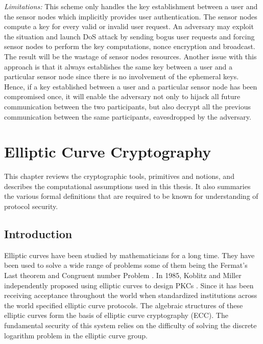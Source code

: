 \documentclass[a4paper,12pt]{report}
\begin{document}
\noindent \textit{Limitations:} This scheme only handles the key
establishment between a user and the sensor nodes which implicitly
provides user authentication. The sensor nodes compute a key for
every valid or invalid user request. An adversary may exploit the
situation and launch DoS attack by sending bogus user requests and
forcing sensor nodes to perform the key computations, nonce
encryption and broadcast. The result will be the wastage of sensor
nodes resources. Another issue with this approach is that it always
establishes the same key between a user and a particular sensor node
since there is no involvement of the ephemeral keys. Hence, if a key
established between a user and a particular sensor node has been
compromised once, it will enable the adversary not only to hijack
all future communication between the two participants, but also
decrypt all the previous communication between the same
participants, eavesdropped by the adversary.\\

\afterpage{\null\newpage}

\chapter{Elliptic Curve Cryptography}
\label{Ch3} This chapter reviews the cryptographic tools, primitives
and notions, and describes the computational assumptions used in
this thesis. It also summaries the various formal definitions that
are required to be known for understanding of protocol security.
\medskip
\medskip
\section{Introduction}
Elliptic curves have been studied by mathematicians for a long time.
They have been used to solve a wide range of problems some of them
being the Fermat's Last theorem and Congruent number Problem
\cite{koblitz}. In 1985, Koblitz and Miller independently proposed
using elliptic curves to design PKCs \cite{Lopez}. Since it has been
receiving acceptance throughout the world when standardized
institutions across the world specified elliptic curve protocols.
The algebraic structures of these elliptic curves form the basis of
elliptic curve cryptography (ECC). The fundamental security of this
system relies on the difficulty of solving the discrete logarithm
problem in the elliptic curve group.
\end{document}
